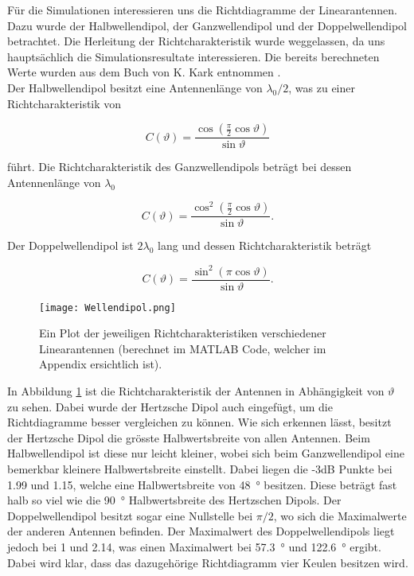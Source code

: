 Für die Simulationen interessieren uns die Richtdiagramme der Linearantennen. Dazu wurde der Halbwellendipol, der Ganzwellendipol und der Doppelwellendipol betrachtet. Die Herleitung der Richtcharakteristik wurde weggelassen, da uns hauptsächlich die Simulationsresultate interessieren. Die bereits berechneten Werte wurden aus dem Buch von K. Kark entnommen \cite{book}.\\

Der Halbwellendipol besitzt eine Antennenlänge von $\lambda_0/2$, was zu einer Richtcharakteristik von 

\begin{equation}\label{eq:RichtHalb}
C(\vartheta) = \frac{\cos \left(\frac{\pi}{2}\cos \vartheta \right)}{\sin \vartheta}
\end{equation}

führt. Die Richtcharakteristik des Ganzwellendipols beträgt bei dessen Antennenlänge von $\lambda_0$

\begin{equation}
C(\vartheta) = \frac{\cos^2 \left(\frac{\pi}{2}\cos \vartheta \right)}{\sin \vartheta}.
\end{equation}

Der Doppelwellendipol ist $2\lambda_0$ lang und dessen Richtcharakteristik beträgt

\begin{equation}\label{eq:RichtDoppel}
C(\vartheta) = \frac{\sin^2 \left(\pi \cos \vartheta \right)}{\sin \vartheta}.
\end{equation}

\begin{figure}[!ht]
	\centering
    \texttt{[image: Wellendipol.png]}
    \caption{Ein Plot der jeweiligen Richtcharakteristiken verschiedener Linearantennen (berechnet im MATLAB Code, welcher im Appendix ersichtlich ist).}
    \label{fig:Wellendipol}
\end{figure}

In Abbildung \ref{fig:Wellendipol} ist die Richtcharakteristik der Antennen in Abhängigkeit von $\vartheta$ zu sehen. Dabei wurde der Hertzsche Dipol auch eingefügt, um die Richtdiagramme besser vergleichen zu können. Wie sich erkennen lässt, besitzt der Hertzsche Dipol die grösste Halbwertsbreite von allen Antennen. Beim Halbwellendipol ist diese nur leicht kleiner, wobei sich beim Ganzwellendipol eine bemerkbar kleinere Halbwertsbreite einstellt. Dabei liegen die -3dB Punkte bei \num{1.99} und \num{1.15}, welche eine Halbwertsbreite von \SI{48}{\degree} besitzen. Diese beträgt fast halb so viel wie die \SI{90}{\degree} Halbwertsbreite des Hertzschen Dipols. Der Doppelwellendipol besitzt sogar eine Nullstelle bei $\pi/2$, wo sich die Maximalwerte der anderen Antennen befinden. Der Maximalwert des Doppelwellendipols liegt jedoch bei \num{1} und \num{2.14}, was einen Maximalwert bei \SI{57.3}{\degree} und \SI{122.6}{\degree} ergibt. Dabei wird klar, dass das dazugehörige Richtdiagramm vier Keulen besitzen wird.\\

